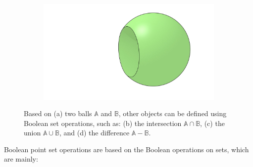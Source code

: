 \begin{figure}
\begin{subfigure}[b]{0.5\linewidth}
\caption{}%
\label{subfig:boolean-union}
\end{subfigure}%
\begin{subfigure}[b]{0.5\linewidth}
\includegraphics[width=\linewidth]{figs/boolean-difference}
\caption{}%
\label{subfig:boolean-difference}
\end{subfigure}
\caption{Based on (a) two balls \(\mathbb{A}\) and \(\mathbb{B}\), other objects can be defined using Boolean set operations, such as: (b) the intersection \(\mathbb{A} \cap \mathbb{B}\), (c) the union \(\mathbb{A} \cup \mathbb{B}\), and (d) the difference \(\mathbb{A} - \mathbb{B}\).}%
\label{fig:boolean}
\end{figure}

Boolean point set operations are based on the Boolean operations on sets, which are mainly:

